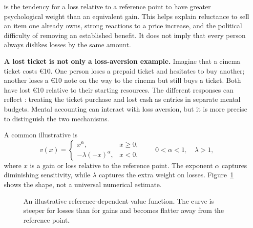  is the tendency for a loss relative to a reference
point to have greater psychological weight than an equivalent gain. This
helps explain reluctance to sell an item one already owns, strong reactions to
a price increase, and the political difficulty of removing an established
benefit. It does not imply that every person always dislikes losses by the
same amount.

\begin{exercisebox}
\textbf{A lost ticket is not only a loss-aversion example.}
Imagine that a cinema ticket costs \euro10. One person loses a prepaid ticket
and hesitates to buy another; another loses a \euro10 note on the way to the
cinema but still buys a ticket. Both have lost \euro10 relative to their
starting resources. The different responses can reflect : treating the ticket purchase and lost cash as entries in separate
mental budgets. Mental accounting can interact with loss aversion, but it is
more precise to distinguish the two mechanisms.
\end{exercisebox}

A common illustrative  is
\[
v(x)=
\begin{cases}
x^\alpha, & x\geq 0,\\
-\lambda(-x)^\alpha, & x<0,
\end{cases}
\qquad
0<\alpha<1,\quad \lambda>1,
\]
where \(x\) is a gain or loss relative to the reference point. The exponent
\(\alpha\) captures diminishing sensitivity, while \(\lambda\) captures the
extra weight on losses. Figure~\ref{fig:reference-dependent-value} shows the
shape, not a universal numerical estimate.

\begin{figure}[htbp]
  \centering
  \caption{An illustrative reference-dependent value function. The curve is
  steeper for losses than for gains and becomes flatter away from the
  reference point.}
  \label{fig:reference-dependent-value}
\end{figure}
\FloatBarrier

